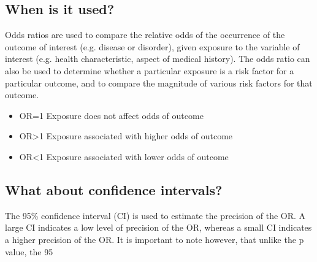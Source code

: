 \subsection{When is it used?}
Odds ratios are used to compare the relative odds of the occurrence of the outcome of interest (e.g. disease or disorder), given exposure to the variable of interest (e.g. health characteristic, aspect of medical history). The odds ratio can also be used to determine whether a particular exposure is a risk factor for a particular outcome, and to compare the magnitude of various risk factors for that outcome.

\begin{itemize}
\item OR=1 Exposure does not affect odds of outcome
\item OR>1 Exposure associated with higher odds of outcome
\item OR<1 Exposure associated with lower odds of outcome
\end{itemize}

\subsection{What about confidence intervals?}
The 95\% confidence interval (CI) is used to estimate the precision of the OR. A large CI indicates a low level of precision of the OR, whereas a small CI indicates a higher precision of the OR. It is important to note however, that unlike the p value, the 95%
